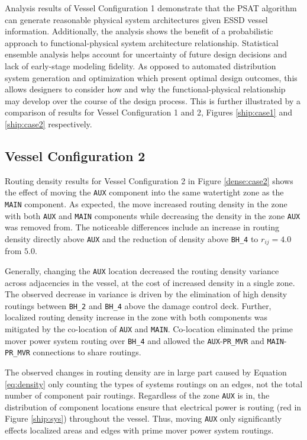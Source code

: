 \documentclass[preprint,12pt]{elsarticle}
\begin{document}
Analysis results of Vessel Configuration 1 demonstrate that the PSAT algorithm can generate reasonable physical system architectures given ESSD vessel information. Additionally, the analysis shows the benefit of a probabilistic approach to functional-physical system architecture relationship. Statistical ensemble analysis helps account for uncertainty of future design decisions and lack of early-stage modeling fidelity. As opposed to automated distribution system generation and optimization which present optimal design outcomes, this allows designers to consider how and why the functional-physical relationship may develop over the course of the design process. This is further illustrated by a comparison of results for Vessel Configuration 1 and 2, Figures \ref{ship:case1} and \ref{ship:case2} respectively.

\subsection{Vessel Configuration 2}

Routing density results for Vessel Configuration 2 in Figure \ref{dense:case2} shows the effect of moving the \texttt{AUX} component into the same watertight zone as the \texttt{MAIN} component. As expected, the move increased  routing density in the zone with both \texttt{AUX} and \texttt{MAIN} components while decreasing the density in the zone \texttt{AUX} was removed from. The noticeable differences include an increase in routing density directly above \texttt{AUX} and the reduction of density above \texttt{BH\_4} to $r_{ij}=4.0$ from $5.0$. 

Generally, changing the \texttt{AUX} location decreased the routing density variance across adjacencies in the vessel, at the cost of increased density in a single zone. The observed decrease in variance is driven by the elimination of high density routings between \texttt{BH\_2} and \texttt{BH\_4} above the damage control deck. Further, localized routing density increase in the zone with both components was mitigated by the co-location of \texttt{AUX} and \texttt{MAIN}. Co-location eliminated the prime mover power system routing over \texttt{BH\_4} and allowed the \texttt{AUX}-\texttt{PR\_MVR} and \texttt{MAIN}-\texttt{PR\_MVR} connections to share routings.  

The observed changes in routing density are in large part caused by Equation \ref{eq:density} only counting the types of systems routings on an edges, not the total number of component pair routings. Regardless of the zone \texttt{AUX} is in, the distribution of component locations ensure that electrical power is routing (red in Figure \ref{ship:sys}) throughout the vessel. Thus, moving \texttt{AUX} only significantly effects localized areas and edges with prime mover power system routings. 
\end{document}
